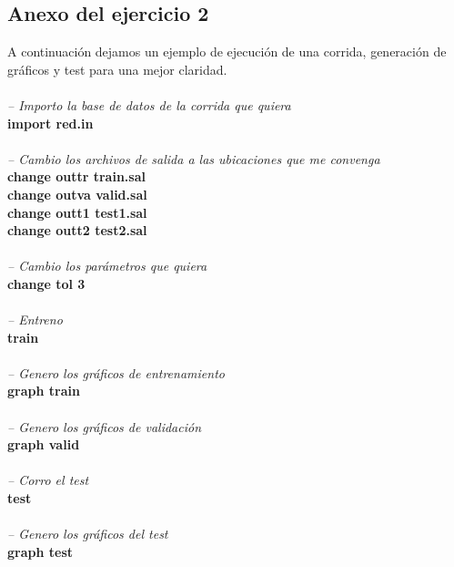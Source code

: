 \documentclass[onecolumn,10pt]{article}
\begin{document}
\subsection{Anexo del ejercicio 2}

A continuación dejamos un ejemplo de ejecución de una corrida, generación de gráficos y test  para una mejor claridad.\\
\\
\textit{-- Importo la base de datos de la corrida que quiera}\\
\textbf{import red.in}\\
\\
\textit{-- Cambio los archivos de salida a las ubicaciones que me convenga} \\
\textbf{change outtr train.sal}\\
\textbf{change outva valid.sal}\\
\textbf{change outt1 test1.sal}\\
\textbf{change outt2 test2.sal}\\
\\
\textit{-- Cambio los parámetros que quiera}\\
\textbf{change tol 3}\\
\\
\textit{-- Entreno}\\
\textbf{train}\\
\\
\textit{-- Genero los gráficos de entrenamiento}\\
\textbf{graph train}\\
\\
\textit{-- Genero los gráficos de validación}\\
\textbf{graph valid}\\
\\
\textit{-- Corro el test}\\
\textbf{test}\\
\\
\textit{-- Genero los gráficos del test}\\
\textbf{graph test}\\
\end{document}
